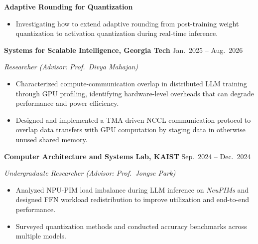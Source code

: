 \documentclass[11pt, a4paper]{article}
\begin{document}
\vspace{0.08cm}

\hspace*{0.6em}\textbf{Adaptive Rounding for Quantization}\par\nopagebreak

\begin{itemize}[leftmargin=2em]
    \item Investigating how to extend adaptive rounding from post-training weight quantization to activation quantization during real-time inference.
\end{itemize}

\vspace{0.18cm}

\textbf{Systems for Scalable Intelligence, Georgia Tech}
\hfill Jan.\ 2025 -- Aug.\ 2026

\begin{description}[wide=0pt]
    \item \textit{Researcher (Advisor: Prof.\ Divya Mahajan)}
\end{description}

\begin{itemize}[leftmargin=2em]
    \item Characterized compute-communication overlap in distributed LLM training through GPU profiling, identifying hardware-level overheads that can degrade performance and power efficiency.
    \item Designed and implemented a TMA-driven NCCL communication protocol to overlap data transfers with GPU computation by staging data in otherwise unused shared memory.
\end{itemize}

\vspace{0.18cm}

\noindent\begin{minipage}{\linewidth}
\textbf{Computer Architecture and Systems Lab, KAIST}
\hfill Sep.\ 2024 -- Dec.\ 2024

\begin{description}[wide=0pt]
    \item \textit{Undergraduate Researcher (Advisor: Prof.\ Jongse Park)}
\end{description}

\begin{itemize}[leftmargin=2em]
    \item Analyzed NPU-PIM load imbalance during LLM inference on \textit{NeuPIMs} and designed FFN workload redistribution to improve utilization and end-to-end performance.
    \item Surveyed quantization methods and conducted accuracy benchmarks across multiple models.
\end{itemize}
\end{minipage}
\end{document}
